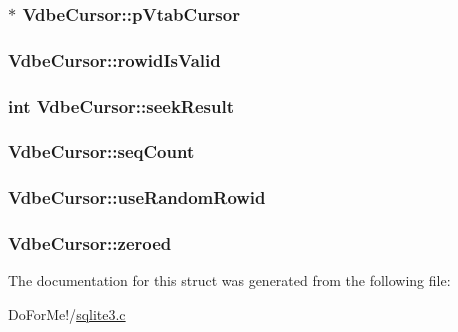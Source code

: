\hypertarget{struct_vdbe_cursor_a2f58fca4f47a313a461f40a0ac553bf5}{
\subsubsection[{p\-Vtab\-Cursor}]{$\ast$ Vdbe\-Cursor\-::p\-Vtab\-Cursor}}\label{struct_vdbe_cursor_a2f58fca4f47a313a461f40a0ac553bf5}
\hypertarget{struct_vdbe_cursor_a2dabf623f6e3c31aa8310c72ec1843bf}{
\subsubsection[{rowid\-Is\-Valid}]{ Vdbe\-Cursor\-::rowid\-Is\-Valid}}\label{struct_vdbe_cursor_a2dabf623f6e3c31aa8310c72ec1843bf}
\hypertarget{struct_vdbe_cursor_a5eff86e2a9c87dc15956ad362aa03f05}{
\subsubsection[{seek\-Result}]{\setlength{\rightskip}{0pt plus 5cm}int Vdbe\-Cursor\-::seek\-Result}}\label{struct_vdbe_cursor_a5eff86e2a9c87dc15956ad362aa03f05}
\hypertarget{struct_vdbe_cursor_a4f11f0befb0dcf16273cc832ca6d92a5}{
\subsubsection[{seq\-Count}]{ Vdbe\-Cursor\-::seq\-Count}}\label{struct_vdbe_cursor_a4f11f0befb0dcf16273cc832ca6d92a5}
\hypertarget{struct_vdbe_cursor_a067fff911d6d37190785a0cf5ba4fc8e}{
\subsubsection[{use\-Random\-Rowid}]{ Vdbe\-Cursor\-::use\-Random\-Rowid}}\label{struct_vdbe_cursor_a067fff911d6d37190785a0cf5ba4fc8e}
\hypertarget{struct_vdbe_cursor_abcc5ef422583a743105243e2a0c7859e}{
\subsubsection[{zeroed}]{ Vdbe\-Cursor\-::zeroed}}\label{struct_vdbe_cursor_abcc5ef422583a743105243e2a0c7859e}


The documentation for this struct was generated from the following file\-:\begin{DoxyCompactItemize}
\item 
Do\-For\-Me!/\hyperlink{sqlite3_8c}{sqlite3.\-c}\end{DoxyCompactItemize}
